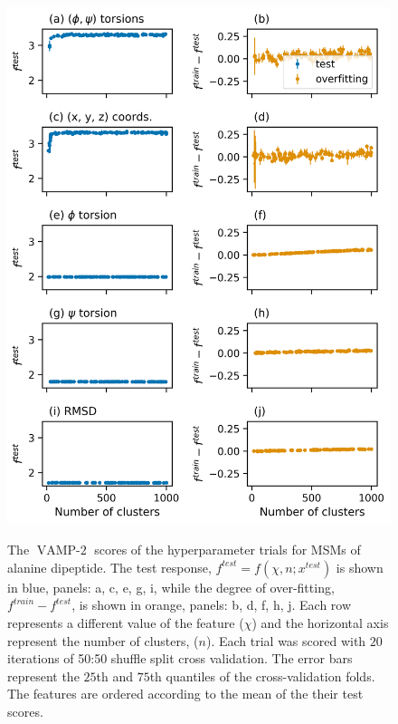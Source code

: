 \begin{figure}
    \centering
    \caption{The $\operatorname{VAMP-2}$ scores of the hyperparameter trials for MSMs of alanine dipeptide. The test response, $f^{test} = f(\chi, n; x^{test})$ is shown in blue, panels: a, c, e, g, i,  while the degree of over-fitting, $f^{train} - f^{test}$, is shown in orange, panels: b, d, f, h, j. Each row represents a different value of the feature ($\chi$) and the horizontal axis represent the number of clusters, ($n$). Each trial was scored with $20$ iterations of 50:50 shuffle split cross validation. The error bars represent the $25$th and $75$th quantiles of the cross-validation folds. 
    The features are ordered according to the mean of the their test scores.}
    \includegraphics[height=0.8\textheight]{chapters/msm_optimization/figures/ala1_train_test_results.png}
    \label{fig:ala1_train_test}
\end{figure}

